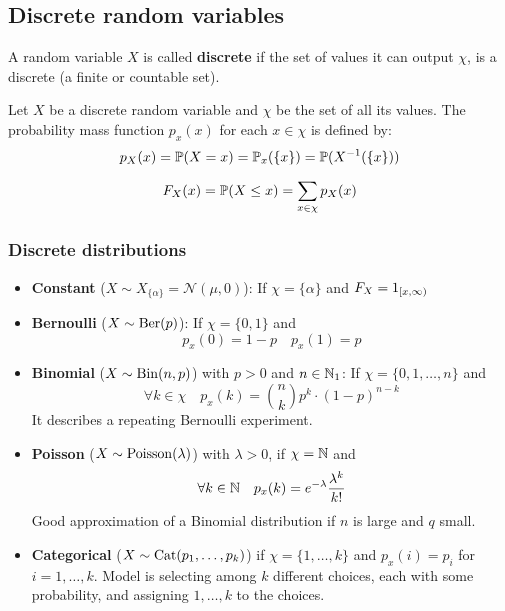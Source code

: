 \subsection{Discrete random variables}
A random variable \(X\) is called \textbf{discrete} if the set of values it can output \(\chi\), is a discrete (a finite or countable set).

\begin{ddefinition*}
  Let \(X\) be a discrete random variable and \(\chi\) be the set of all its values. The probability mass function \(p_x(x)\) for each \(x \in \chi\) is defined by:
  \[p_X(x) = \P(X = x) = \P_x(\{x\}) = \P(X^{-1}(\{x\}))\]
\end{ddefinition*}

\begin{ddefinition*}
  \[F_X(x) = \P(X \leq x) = \sum_{x \in \chi} p_X(x)\]
\end{ddefinition*}

\subsubsection{Discrete distributions}
\begin{itemize}
  \item \textbf{Constant} (\(X \sim X_{\{\alpha\}} = \mathcal{N}(\mu, 0)\)): If \(\chi = \{\alpha\}\) and \(F_X = \I_{[x, \infty)}\)
  \item \textbf{Bernoulli} (\(X \sim \Ber(p)\)): If \(\chi = \{0, 1\}\) and
  \[p_x(0) = 1 - p \quad p_x(1) = p\]

  \item \textbf{Binomial} (\(X \sim \Bin(n, p)\)) with \(p > 0\) and \(n \in \N_1\): If \(\chi = \{0, 1, \ldots, n\}\) and
  \[\forall k \in \chi \quad p_x(k) = \binom{n}{k} p^k \cdot (1 - p)^{n -k}\]
  It describes a repeating Bernoulli experiment.

  \item \textbf{Poisson} (\(X \sim \Poisson(\lambda)\)) with \(\lambda > 0\), if \(\chi = \N\) and
  \[\forall k \in \N \quad p_x(k) = e^{-\lambda} \frac{\lambda^k}{k!}\]
  Good approximation of a Binomial distribution if \(n\) is large and \(q\) small.

  \item \textbf{Categorical} (\(X \sim \Cat(p_1, \ldots, p_k)\)) if \(\chi = \{1, \ldots, k\}\) and \(p_x(i) = p_i\) for \(i = 1, \ldots, k\). Model is selecting among \(k\) different choices, each with some probability, and assigning \(1, \ldots, k\) to the choices.
\end{itemize}


